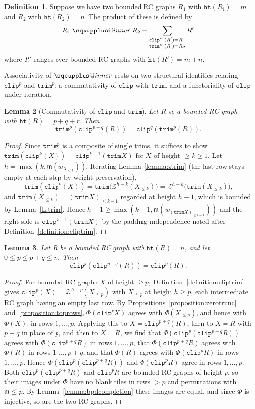 \documentclass{amsart}
\makeatletter
\newcommand{\sqcupplus@inner}[2]{%
  \vcenter{\hbox{\ooalign{%
    \hfil$\m@th#1\sqcup$\hfil\cr
    \hfil\raisebox{0.15ex}{$\m@th#1\scriptscriptstyle+$}\hfil\cr
  }}}%
}
\newcommand{\sqcupplus}{\mathbin{\mathpalette\sqcupplus@inner\relax}}
\newtheorem{lemma}{Lemma}[subsection]
\theoremstyle{definition}
\newtheorem{definition}[lemma]{Definition}
\theoremstyle{remark}
\numberwithin{equation}{subsection}
\newcommand{\wof}[1]{w_{#1}}
\newcommand{\trm}{\mathtt{trim}}
\newcommand{\zeromap}{\mathcal{Z}}
\newcommand{\hr}{\mathtt{ht}}
\newcommand{\clp}{\mathtt{clip}}
\newcommand{\maxd}{\mathfrak{m}}
\makeatother
\begin{document}
\begin{definition}\label{definition:ringproduct}
Suppose we have two bounded RC graphs $R_1$ with $\hr(R_1)=m$ and $R_2$ with $\hr(R_2)=n$. The product of these is defined by
$$R_1\sqcupplus R_2 = \sum_{\substack{\clp^m(R')=R_1\\\trm^m(R')=R_2}}R'$$  
where $R'$ ranges over bounded RC graphs with $\hr(R')=m+n$.
\end{definition}

Associativity of $\sqcupplus$ rests on two structural identities relating $\clp^p$ and $\trm^p$: a commutativity of $\clp$ with $\trm$, and a functoriality of $\clp$ under iteration.

\begin{lemma}[Commutativity of $\clp$ and $\trm$] \label{lemma:clptrm}
Let $R$ be a bounded RC graph with $\hr(R)=p+q+r$. Then
$$\trm^p(\clp^{p+q}(R))=\clp^q(\trm^p(R)).$$
\end{lemma}
\begin{proof}
Since $\trm^p$ is a composite of single trims, it suffices to show $\trm(\clp^{k}(X))=\clp^{k-1}(\trm X)$ for $X$ of height $\geq k\geq 1$. Let $h=\max(k,\maxd(\wof{X_{\leq k}}))$. Iterating Lemma~\ref{lemma:ztrim} (the last row stays empty at each step by weight preservation),
$$\trm(\clp^{k}(X))=\trm\bigl(\zeromap^{h-k}(X_{\leq k})\bigr)=\zeromap^{h-k}\bigl(\trm(X_{\leq k})\bigr)\text{,}$$
and $\trm(X_{\leq k})=(\trm X)_{\leq k-1}$ regarded at height $h-1$, which is bounded by Lemma~\ref{L:trim}. Hence $h-1\geq\max(k-1,\maxd(\wof{(\trm X)_{\leq k-1}}))$ and the right side is $\clp^{k-1}(\trm X)$ by the padding independence noted after Definition~\ref{definition:cliptrim}.
\end{proof}

\begin{lemma} \label{lemma:clpfunc}
Let $R$ be a bounded RC graph with $\hr(R)=n$, and let $0\leq p\leq p+q\leq n$. Then
$$\clp^p(\clp^{p+q}(R))=\clp^p(R).$$
\end{lemma}
\begin{proof}
For bounded RC graphs $X$ of height $\geq p$, Definition~\ref{definition:cliptrim} gives $\clp^p(X)=\zeromap^{\,h-p}(X_{\leq p})$ with $X_{\leq p}$ at height $h\geq p$, each intermediate RC graph having an empty last row. By Propositions~\ref{proposition:zerotrunc} and~\ref{proposition:toprows}, $\Phi(\clp^pX)$ agrees with $\Phi(X_{\leq p})$, and hence with $\Phi(X)$, in rows $1,\ldots,p$. Applying this to $X=\clp^{p+q}(R)$, then to $X=R$ with $p+q$ in place of $p$, and then to $X=R$, we find that $\Phi(\clp^p(\clp^{p+q}R))$ agrees with $\Phi(\clp^{p+q}R)$ in rows $1,\ldots,p$, that $\Phi(\clp^{p+q}R)$ agrees with $\Phi(R)$ in rows $1,\ldots,p+q$, and that $\Phi(R)$ agrees with $\Phi(\clp^pR)$ in rows $1,\ldots,p$. Hence $\Phi(\clp^p(\clp^{p+q}R))$ and $\Phi(\clp^pR)$ agree in rows $1,\ldots,p$. Both $\clp^p(\clp^{p+q}R)$ and $\clp^pR$ are bounded RC graphs of height $p$, so their images under $\Phi$ have no blank tiles in rows $>p$ and permutations with $\maxd\leq p$. By Lemma~\ref{lemma:bpdcompletion} these images are equal, and since $\Phi$ is injective, so are the two RC graphs.
\end{proof}
\end{document}
